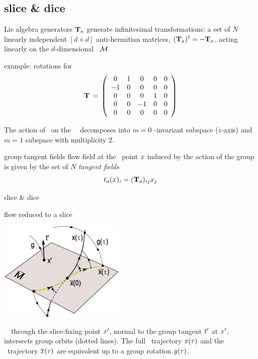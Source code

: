 \documentclass{beamer}
\begin{document}
\subsection{slice \& dice}

\begin{frame}{Lie algebra generators}
$\Lg_a$ generate infinitesimal
transformations: a set of $N$ linearly independent
$[d\!\times\!d]$ anti-hermitian matrices, $(\Lg_a)^\dagger =
- \Lg_a$, acting linearly on the $d$-dim\-ens\-ion\-al
\statesp\ $\pS$
\begin{block}{example:  rotations for \cLe}
\[
 \Lg \,=\,   \left(\barr{ccccc}
    0  &  1 & 0  &  0 & 0  \\
   -1  &  0 & 0  &  0 & 0 \\
    0  &  0 & 0  &  1 & 0  \\
    0  &  0 &-1  &  0 & 0 \\
    0  &  0 & 0  &  0 & 0
    \earr\right)
\] %
\end{block}
The action of \
on the \cLe\ \statesp\ decomposes into $m=0$ \Group-invariant
subspace ($z$-axis) and  $m=1$ subspace with multiplicity 2.
\end{frame}

\begin{frame}{group tangent fields}
flow field at the \statesp\
point $\ssp$ induced by the action of the group is given by
the set of $N$ \emph{tangent fields}
\[
\groupTan_a(\ssp)_{i}= (\Lg_a){}_{ij} \ssp_j
\] %
\end{frame}


\begin{frame}{slice \& dice}
\begin{block}{flow reduced to a slice}
\begin{center}
  \includegraphics[width=0.45\textwidth,clip=true]
  {../../Fig/ReducTraj3}
\end{center}
\end{block}
\Slice\ \pSRed\
through the slice-fixing point $\slicep$,
normal to the group tangent $\sliceTan{}$ at $\slicep$,
intersects
group orbits (dotted lines).
The full
\statesp\ trajectory $\ssp(\tau)$ and the \reducedsp\
trajectory $\sspRed(\tau)$ are equivalent up to a group rotation
$\LieEl(\tau)$.
\end{frame}
\end{document}
